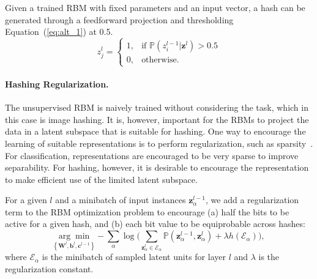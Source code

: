 \documentclass[10pt,twocolumn,letterpaper]{article}
\begin{document}
Given a trained RBM with fixed parameters and an input vector, a hash can be generated through a feedforward projection and thresholding Equation~(\ref{eq:alt_1}) at 0.5.
\begin{equation}
z^{l}_j=\begin{cases}
1,& \text{if } \mathbb{P}(z^{l-1}_i| \mathbf{z}^{l})>0.5\\
    0,              & \text{otherwise}.
\end{cases}
\label{eq:ffactivate}
\end{equation}

\paragraph{Hashing Regularization.}

The unsupervised RBM is naively trained without considering the task, which in this case is image hashing. It is, however, important for the RBMs to project the data in a latent subspace that is suitable for hashing. One way to encourage the learning of suitable representations is to perform regularization, such as sparsity~\cite{honglakSparsity,hintonSparsity,hanlinSparsity}. %
For classification, representations are encouraged to be very sparse to improve separability. 
For hashing, however, it is desirable to encourage the representation to make efficient use of the limited latent subspace.

For a given $l$ and a minibatch of input instances $\mathbf{z}_{\alpha}^{l-1}$, we add a regularization term to the RBM optimization problem to encourage (a) half the bits to be active for a given hash, and (b) each bit value to be equiprobable across hashes:
\begin{equation}\label{eq:sparseproblem}
\underset{\left\{\mathbf{W}^{l},\mathbf{b}^{l},\mathbf{c}^{l-1}\right\}}{\arg\min}\!-\!\sum_{\alpha}\log\!\bigg(\sum_{\mathbf{z}^{l}_{\alpha}\in\mathcal{E}_{\alpha}}\mathbb{P}(\mathbf{z}^{l-1}_{\alpha},\mathbf{z}^{l}_{\alpha})+\lambda h(\mathcal{E}_{\alpha})\!\bigg),\!
\end{equation}
where $\mathcal{E}_{\alpha}$ is the minibatch of sampled latent units for layer $l$ and $\lambda$ is the regularization constant.
\end{document}
